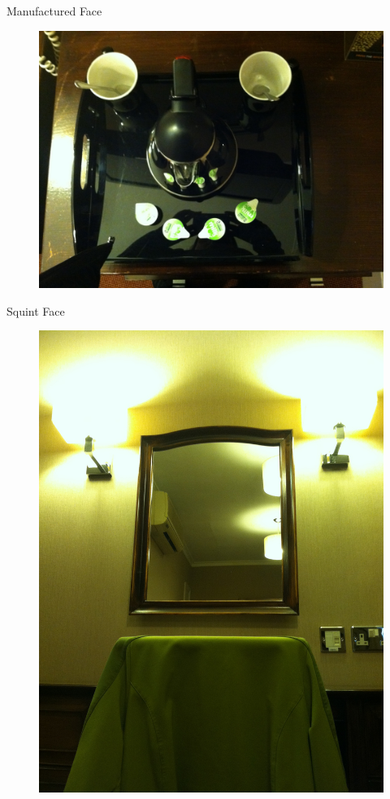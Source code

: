 \documentclass[compress]{beamer}
\begin{document}
\begin{frame}{Manufactured Face}
  \begin{figure}
    \includegraphics[height=0.8\textheight]{assets/manufacturedface.jpg}
  \end{figure}
\end{frame}

\begin{frame}{Squint Face}
  \begin{figure}
    \includegraphics[height=0.8\textheight]{assets/squintface.jpg}
  \end{figure}
\end{frame}
\end{document}
